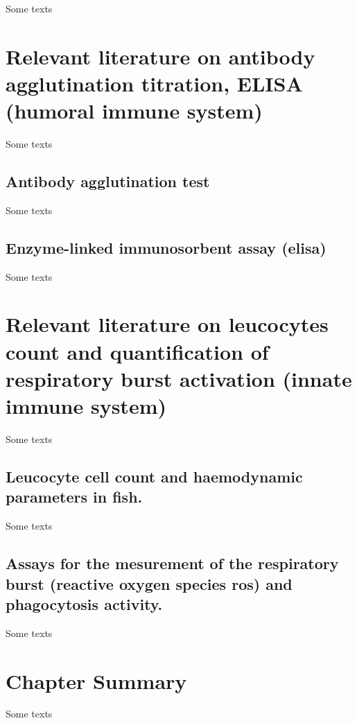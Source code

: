 Some texts

\newpage

\section{Relevant literature on antibody agglutination titration, ELISA (humoral immune system)} 
\label{sec:agglutination-elisa}

Some texts

\subsection{Antibody agglutination test}
\label{ssec:agglutination}

Some texts

\subsection{Enzyme-linked immunosorbent assay (\ac{elisa})}
\label{ssec:elisa}

Some texts

\newpage

\section{Relevant literature on leucocytes count and quantification of respiratory burst activation (innate immune system)}
\label{sec:leucocytes-respiratory-burst-activation}

Some texts

\subsection{Leucocyte cell count and haemodynamic parameters in fish.}
\label{ssec:leucocyte-count-heamodynamic-parameters}

Some texts

\subsection{Assays for the mesurement of the respiratory burst (reactive oxygen species \ac{ros}) and phagocytosis activity.}
\label{ssec:ROS-measurement-colorimetrie}

Some texts

\section{Chapter Summary}

Some texts


\FloatBarrier

